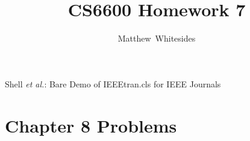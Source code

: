 \documentclass[journal,onecolumn]{IEEEtran}
\begin{document}
%
\title{CS6600 Homework 7}

%
%
%
\author{Matthew~Whitesides}%

%
{Shell \MakeLowercase{\textit{et al.}}: Bare Demo of IEEEtran.cls for IEEE Journals}

\maketitle


\IEEEpeerreviewmaketitle

\section{Chapter 8 Problems}
\end{document}
